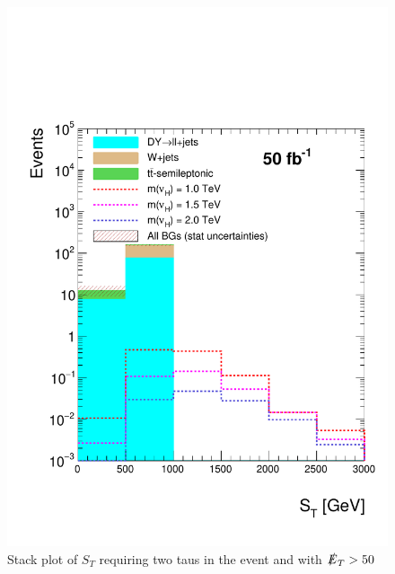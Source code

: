 \begin{figure}
\centering
\includegraphics[width=\linewidth]{StackPlots/ST_2taus_met50_50ifb.pdf}
\caption{Stack plot of $S_{T}$ requiring two taus in the event and with $\slashed{E}_{T} > 50$}
\label{fig: HT2tausMet60}
\end{figure}



